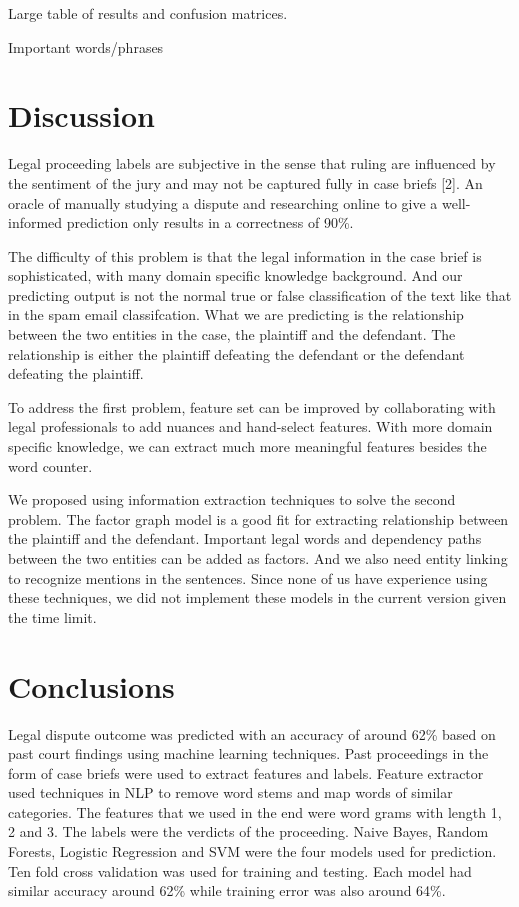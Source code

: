 \documentclass[journal]{IEEEtran}
\begin{document}
Large table of results and confusion matrices.

Important words/phrases

\section{Discussion}

Legal proceeding labels are subjective in the sense that ruling are influenced by the sentiment of the jury and may not be captured fully in case briefs [2]. An oracle of manually studying a dispute and researching online to give a well-informed prediction only results in a correctness of 90\%.

The difficulty of this problem is that the legal information in the case brief is sophisticated, with many domain specific knowledge background. And our predicting output is not the normal true or false classification of the text like that in the spam email classifcation. What we are predicting is the relationship between the two entities in the case, the plaintiff and the defendant. The relationship is either the plaintiff defeating the defendant or the defendant defeating the plaintiff.

To address the first problem, feature set can be improved by collaborating with legal professionals to add nuances and hand-select features. With more domain specific knowledge, we can extract much more meaningful features besides the word counter.

We proposed using information extraction techniques to solve the second problem. The factor graph model is a good fit for extracting relationship between the plaintiff and the defendant. Important legal words and dependency paths between the two entities can be added as factors. And we also need entity linking to recognize mentions in the sentences. Since none of us have experience using these techniques, we did not implement these models in the current version given the time limit. 


\section{Conclusions}

Legal dispute outcome was predicted with an accuracy of around 62\% based on past court findings using machine learning techniques. Past proceedings in the form of case briefs were used to extract features and labels. Feature extractor used techniques in NLP to remove word stems and map words of similar categories. The features that we used in the end were word grams with length 1, 2 and 3. The labels were the verdicts of the proceeding. Naive Bayes, Random Forests, Logistic Regression and SVM were the four models used for prediction. Ten fold cross validation was used for training and testing. Each model had similar accuracy around 62\% while training error was also around 64\%. 
\end{document}
